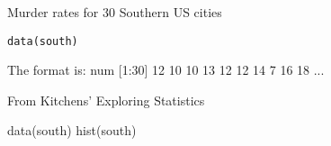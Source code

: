 \begin{Description}\relax
Murder rates for 30 Southern US cities
\end{Description}
\begin{Usage}
\begin{verbatim}data(south)\end{verbatim}
\end{Usage}
\begin{Format}\relax
The format is:
num [1:30] 12 10 10 13 12 12 14 7 16 18 ...
\end{Format}
\begin{Source}\relax
From Kitchens' Exploring Statistics
\end{Source}
\begin{Examples}
\begin{ExampleCode}
data(south)
hist(south)
\end{ExampleCode}
\end{Examples}

